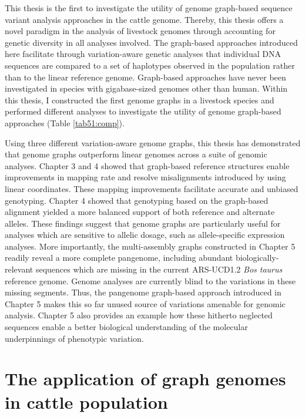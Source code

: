 \documentclass[../main.tex]{subfiles}
\begin{document}
\fi


\graphicspath{{figure/}{../figure/}}

\clearpage
\onehalfspacing

\linespread{1.25}
\setlength{\parskip}{\baselineskip}

\normalsize

This thesis is the first to investigate the utility of genome graph-based sequence variant analysis approaches in the cattle genome. Thereby, this thesis offers a novel paradigm in the analysis of livestock genomes through accounting for genetic diversity in all analyses involved. The graph-based approaches introduced here facilitate through variation-aware genetic analyses that individual DNA sequences are compared to a set of haplotypes observed in the population rather than to the linear reference genome. Graph-based approaches have never been investigated in species with gigabase-sized genomes other than human. Within this thesis, I constructed the first genome graphs in a livestock species and performed different analyses to investigate the utility of genome graph-based approaches (Table \ref{tab51:comp}).


Using three different variation-aware genome graphs, this thesis has demonstrated that genome graphs outperform linear genomes across a suite of genomic analyses. Chapter 3 and 4 showed that graph-based reference structures enable improvements in mapping rate and resolve misalignments introduced by using linear coordinates. These mapping improvements facilitate accurate and unbiased genotyping. Chapter 4 showed that genotyping based on the graph-based alignment yielded a more balanced support of both reference and alternate alleles. These findings suggest that  genome graphs are particularly useful for analyses which are sensitive to allelic dosage, such as allele-specific expression analyses. More importantly, the multi-assembly graphs constructed in Chapter 5 readily reveal a more complete pangenome, including abundant biologically-relevant sequences which are missing in the current ARS-UCD1.2 \emph{Bos taurus} reference genome. Genome analyses are currently blind to the variations in these missing segments. Thus, the pangenome graph-based approach introduced in Chapter 5 makes this so far unused source of variations amenable for genomic analysis. Chapter 5 also provides an example how these hitherto neglected sequences enable a better biological understanding of the molecular underpinnings of phenotypic variation. 

\section{The application of graph genomes in cattle population}
\end{document}

